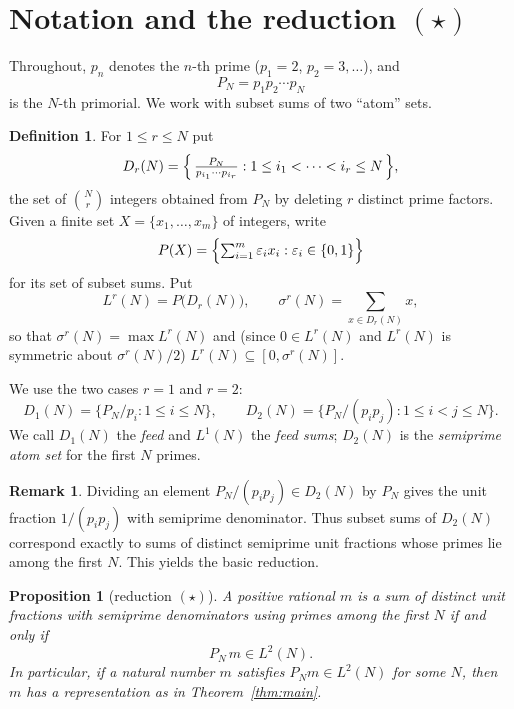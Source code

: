 \documentclass[11pt]{amsart}
\theoremstyle{plain}
\newtheorem{proposition}[theorem]{Proposition}
\theoremstyle{definition}
\newtheorem{definition}[theorem]{Definition}
\newtheorem{remark}[theorem]{Remark}
\begin{document}
\section{Notation and the reduction \texorpdfstring{$(\star)$}{(*)}}
\label{sec:prelim}

Throughout, $p_n$ denotes the $n$-th prime ($p_1=2$, $p_2=3,\dots$), and
\[
P_N=p_1p_2\cdots p_N
\]
is the $N$-th primorial.  We work with subset sums of two ``atom'' sets.

\begin{definition}\label{def:atoms}
For $1\le r\le N$ put
\[
D_r(N)=\Bigl\{\,\tfrac{P_N}{p_{i_1}\cdots p_{i_r}} : 1\le i_1<\cdots<i_r\le N\,\Bigr\},
\]
the set of $\binom{N}{r}$ integers obtained from $P_N$ by deleting $r$ distinct
prime factors.  Given a finite set $X=\{x_1,\dots,x_m\}$ of integers, write
\[
P(X)=\Bigl\{\textstyle\sum_{i=1}^m \varepsilon_i x_i:\varepsilon_i\in\{0,1\}\Bigr\}
\]
for its set of subset sums.  Put
\[
L^r(N)=P\bigl(D_r(N)\bigr),\qquad
\sigma^r(N)=\sum_{x\in D_r(N)} x,
\]
so that $\sigma^r(N)=\max L^r(N)$ and (since $0\in L^r(N)$ and $L^r(N)$ is
symmetric about $\sigma^r(N)/2$) $L^r(N)\subseteq[0,\sigma^r(N)]$.
\end{definition}

We use the two cases $r=1$ and $r=2$:
\[
D_1(N)=\{P_N/p_i : 1\le i\le N\},\qquad
D_2(N)=\{P_N/(p_ip_j):1\le i<j\le N\}.
\]
We call $D_1(N)$ the \emph{feed} and $L^1(N)$ the \emph{feed sums}; $D_2(N)$ is
the \emph{semiprime atom set} for the first $N$ primes.

\begin{remark}
Dividing an element $P_N/(p_ip_j)\in D_2(N)$ by $P_N$ gives the unit fraction
$1/(p_ip_j)$ with semiprime denominator.  Thus subset sums of $D_2(N)$ correspond
exactly to sums of distinct semiprime unit fractions whose primes lie among the
first $N$. This yields the basic reduction.
\end{remark}

\begin{proposition}[reduction $(\star)$]\label{prop:star}
A positive rational $m$ is a sum of distinct unit fractions with semiprime
denominators using primes among the first $N$ if and only if
\begin{equation}
P_N\, m\in L^2(N).
\tag{$\star$}\label{eq:reduction}
\end{equation}
In particular, if a natural number $m$ satisfies $P_N m\in L^2(N)$ for some $N$,
then $m$ has a representation as in Theorem~\ref{thm:main}.
\end{proposition}
\end{document}
